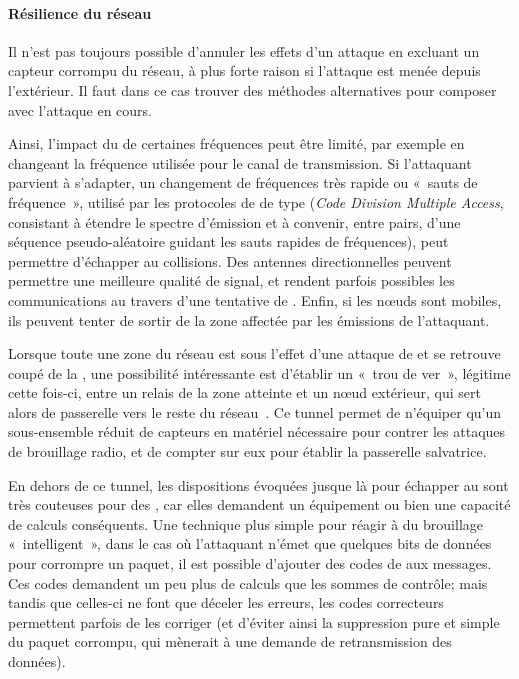 \paragraph{Résilience du réseau}
Il n'est pas toujours possible d'annuler les effets d'un attaque en excluant un capteur corrompu du réseau, à plus forte raison si l'attaque est menée depuis l'extérieur.
Il faut dans ce cas trouver des méthodes alternatives pour composer avec l'attaque en cours.

Ainsi, l'impact du  de certaines fréquences peut être limité, par exemple en changeant la fréquence utilisée pour le canal de transmission.
Si l'attaquant parvient à s'adapter, un changement de fréquences très rapide ou « sauts de fréquence », utilisé par les protocoles de  de type \cdma (\textit{Code Division Multiple Access}, consistant à étendre le spectre d'émission et à convenir, entre pairs, d'une séquence pseudo-aléatoire guidant les sauts rapides de fréquences), peut permettre d'échapper au collisions.
Des antennes directionnelles peuvent permettre une meilleure qualité de signal, et rendent parfois possibles les communications au travers d'une tentative de .
Enfin, si les nœuds sont mobiles, ils peuvent tenter de sortir de la zone affectée par les émissions de l'attaquant.

Lorsque toute une zone du réseau est sous l'effet d'une attaque de  et se retrouve coupé de la \sdb, une possibilité intéressante est d'établir un « trou de ver », légitime cette fois-ci, entre un relais de la zone atteinte et un nœud extérieur, qui sert alors de passerelle vers le reste du réseau~\cite{CCH07}.
Ce tunnel permet de n'équiper qu'un sous-ensemble réduit de capteurs en matériel nécessaire pour contrer les attaques de brouillage radio, et de compter sur eux pour établir la passerelle salvatrice.

En dehors de ce tunnel, les dispositions évoquées jusque là pour échapper au  sont très couteuses pour des \rcs, car elles demandent un équipement ou bien une capacité de calculs conséquents.
Une technique plus simple pour réagir à du brouillage « intelligent », dans le cas où l'attaquant n'émet que quelques bits de données pour corrompre un paquet, il est possible d'ajouter des codes de  aux messages.
Ces codes demandent un peu plus de calculs que les sommes de contrôle; mais tandis que celles-ci ne font que déceler les erreurs, les codes correcteurs permettent parfois de les corriger (et d'éviter ainsi la suppression pure et simple du paquet corrompu, qui mènerait à une demande de retransmission des données).

